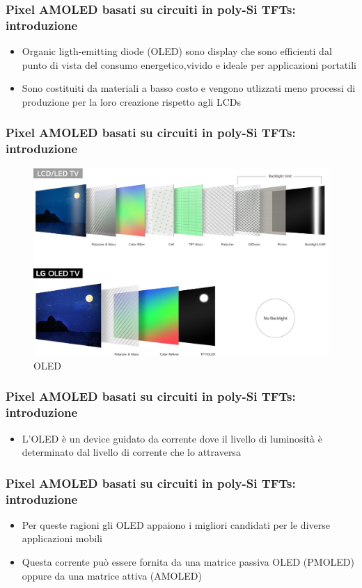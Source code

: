 \documentclass[12pt]{beamer}
\begin{document}
	\begin{frame}
		\frametitle{Pixel AMOLED basati su circuiti in poly-Si TFTs: introduzione}
		\begin{itemize}
			\item Organic ligth-emitting diode (OLED) sono display che sono efficienti dal punto di vista del consumo energetico,vivido e ideale per applicazioni portatili 
			\pause
			\item Sono costituiti da materiali a basso costo e vengono utlizzati meno processi di produzione per la loro creazione rispetto agli LCDs
		\end{itemize}
	\end{frame}
	\begin{frame}
		\frametitle{Pixel AMOLED basati su circuiti in poly-Si TFTs: introduzione}
		\begin{figure}
			\centering
			\includegraphics[width=1\linewidth]{IMMAGINI/oled}
			\caption{OLED}
			\label{fig:oled}
		\end{figure}
	\end{frame}
	\begin{frame}
		\frametitle{Pixel AMOLED basati su circuiti in poly-Si TFTs: introduzione}
		\begin{itemize}
			\item L’OLED è un device guidato da corrente dove il livello di luminosità è determinato dal livello di corrente che lo attraversa
		\end{itemize}
	\end{frame}
	\begin{frame}
		\frametitle{Pixel AMOLED basati su circuiti in poly-Si TFTs: introduzione}
		\begin{itemize}
			\item Per queste ragioni gli OLED appaiono i migliori candidati per le diverse applicazioni mobili
			\pause
			\item Questa corrente può essere fornita da una matrice passiva OLED (PMOLED) oppure da una matrice attiva (AMOLED)
		\end{itemize}
	\end{frame}
\end{document}
